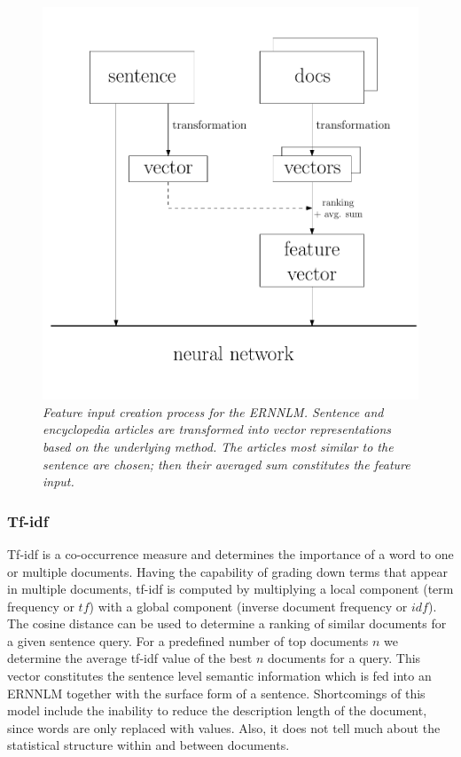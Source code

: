 \documentclass[a4paper]{article}
\begin{document}
\begin{figure} 
\centering 
\includegraphics[width=\columnwidth]{flow.pdf}
\caption{\it Feature input creation process for the ERNNLM. Sentence and encyclopedia articles are transformed into vector representations based on the underlying method. The articles most similar to the sentence are chosen; then their averaged sum constitutes the feature input.}
\label{fig:flow}
\end{figure}

\subsubsection{Tf-idf}
Tf-idf \cite{salton1986introduction} is a co-occurrence measure and determines the importance of a word to one or multiple documents. Having the capability of grading down terms that appear in multiple documents, tf-idf is computed by multiplying a local component (term frequency or $tf$) with a global component (inverse document frequency or $idf$).
The cosine distance can be used to determine a ranking of similar documents for a given sentence query.
For a predefined number of top documents $n$ we determine the average tf-idf value of the best $n$ documents for a query.
This vector constitutes the sentence level semantic information which is fed into an ERNNLM together with the surface form of a sentence.
Shortcomings of this model include the inability to reduce the description length of the document, since words are only replaced with values. Also, it does not tell much about the statistical structure within and between documents.
\end{document}
